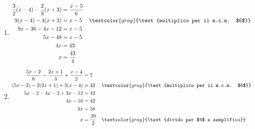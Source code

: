 \begin{question}[ID=2.5, subtitle={Equazioni di primo grado con frazioni}, difficulty=difficile, tags={equazioni lineari}]
\begin{explanation}
\begin{enumerate}
\[\begin{aligned}
    5x-15-6x-2 &= x-7\\
    -x-17 &= x-7\\
    -2x &= 10\\
    x &= -5
    \end{aligned}\]
    \item \[\begin{aligned}
    \dfrac32(x-4)-\dfrac23(x+3) &= \dfrac{x-5}{6}\\
    9(x-4)-4(x+3) &= x-5 && \textcolor{gray}{\text{moltiplico per il m.c.m. $6$}}\\
    9x-36-4x-12 &= x-5\\
    5x-48 &= x-5\\
    4x &= 43\\
    x &= \dfrac{43}{4}
    \end{aligned}\]
    \item \[\begin{aligned}
    \dfrac{5x-2}{6}-\dfrac{2x+1}{3}+\dfrac{x-4}{2} &= 7\\
    (5x-2)-2(2x+1)+3(x-4) &= 42 && \textcolor{gray}{\text{moltiplico per il m.c.m. $6$}}\\
    5x-2-4x-2+3x-12 &= 42\\
    4x-16 &= 42\\
    4x &= 58\\
    x &= \dfrac{29}{2} && \textcolor{gray}{\text{divido per $4$ e semplifico}}
    \end{aligned}\]
\end{enumerate}
\end{explanation}
\end{question}



